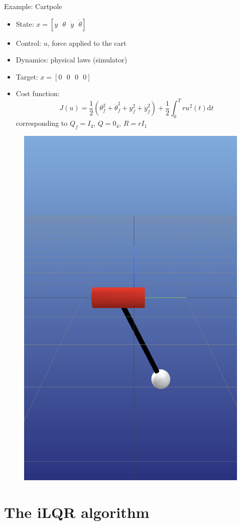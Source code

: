 \documentclass[aspectratio=169]{beamer}
\theoremstyle{definition}
\begin{document}
\begin{frame}{Example: Cartpole}
    \begin{minipage}[c]{0.6\linewidth}
        \begin{itemize}
            \item State: $x=[y\:\:\:\theta\:\:\:\dot{y}\:\:\:\dot{\theta}]$
            \item Control: $u$, force applied to the cart
            \item Dynamics: physical laws (simulator)
            \item Target: $x=[0\:\:\:0\:\:\:0\:\:\:0]$
            \item Cost function:
            \begin{equation*}
                J(u) = \frac{1}{2}\left(\theta_f^2+\dot{\theta}_f^2 + y_f^2 + \dot{y}_f^2\right) + \frac{1}{2}\int_0^T ru^2(t) \mathrm{d} t
            \end{equation*}
            corresponding to $Q_f = I_4$, $Q=0_4$, $R=rI_1$
        \end{itemize}
    \end{minipage}
    \hspace{0.25cm}
    \begin{minipage}[c]{0.35\linewidth}
        \begin{figure}
            \centering
            \includegraphics[width=0.7\linewidth]{cartpole.png}
        \end{figure}
    \end{minipage}
\end{frame}

\section{The iLQR algorithm}


\begin{frame}[allowframebreaks]
    \nocite{*}
    \printbibliography
\end{frame}
\end{document}
